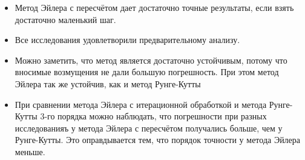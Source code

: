 \documentclass[a4paper]{article}
\begin{document}
\begin{itemize}
  \item Метод Эйлера с пересчётом дает достаточно точные результаты, если взять достаточно маленький шаг.
  \item Все исследования удовлетворили предварительному анализу.
  \item Можно заметить, что метод является достаточно устойчивым, потому что вносимые возмущения не дали большую погрешность. При этом метод Эйлера так же устойчив, как и метод Рунге-Кутты
  \item При сравнении метода Эйлера с итерационной обработкой и метода Рунге-Кутты 3-го порядка можно наблюдать, что погрешности при разных исследованияъ у метода Эйлера с пересчётом получались больше, чем у Рунге-Кутты. Это оправдывается тем, что порядок точности у метода Эйлера меньше. 
  \end{itemize}
\end{document}

